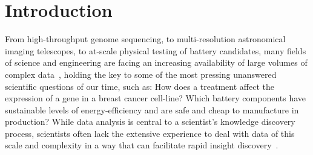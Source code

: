 \section{Introduction} \label{intro}
From high-throughput genome sequencing, 
to multi-resolution astronomical imaging telescopes,
to at-scale physical testing of battery candidates,
many fields of science and engineering
are facing an increasing availability of 
large volumes of complex data~\cite{AustinNothaft2015,Demchenko2013},
holding the key to some of the most pressing 
unanswered scientific questions of our time,
such as: How does a treatment affect the 
expression of a gene in a breast cancer cell-line? 
Which battery components have sustainable levels 
of energy-efficiency and are safe and cheap to 
manufacture in production?  
While data analysis is central to a scientist's 
knowledge discovery process, scientists 
often lack the extensive experience to deal 
with data of this scale and complexity 
in a way that can facilitate rapid insight discovery~\cite{Kersten2011}. 

